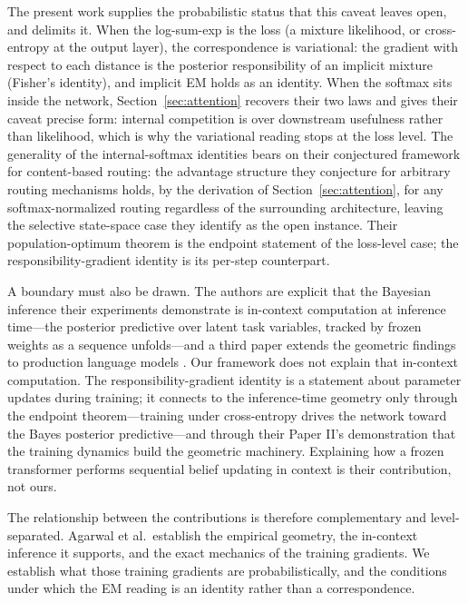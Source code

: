 The present work supplies the probabilistic status that this caveat leaves open, and delimits it. When the log-sum-exp is the loss (a mixture likelihood, or cross-entropy at the output layer), the correspondence is variational: the gradient with respect to each distance is the posterior responsibility of an implicit mixture (Fisher's identity), and implicit EM holds as an identity. When the softmax sits inside the network, Section~\ref{sec:attention} recovers their two laws and gives their caveat precise form: internal competition is over downstream usefulness rather than likelihood, which is why the variational reading stops at the loss level. The generality of the internal-softmax identities bears on their conjectured framework for content-based routing: the advantage structure they conjecture for arbitrary routing mechanisms holds, by the derivation of Section~\ref{sec:attention}, for any softmax-normalized routing regardless of the surrounding architecture, leaving the selective state-space case they identify as the open instance. Their population-optimum theorem is the endpoint statement of the loss-level case; the responsibility-gradient identity is its per-step counterpart.

A boundary must also be drawn. The authors are explicit that the Bayesian inference their experiments demonstrate is in-context computation at inference time---the posterior predictive over latent task variables, tracked by frozen weights as a sequence unfolds---and a third paper extends the geometric findings to production language models \citep{agarwal2025scaling}. Our framework does not explain that in-context computation. The responsibility-gradient identity is a statement about parameter updates during training; it connects to the inference-time geometry only through the endpoint theorem---training under cross-entropy drives the network toward the Bayes posterior predictive---and through their Paper II's demonstration that the training dynamics build the geometric machinery. Explaining how a frozen transformer performs sequential belief updating in context is their contribution, not ours.

The relationship between the contributions is therefore complementary and level-separated. Agarwal et al.\ establish the empirical geometry, the in-context inference it supports, and the exact mechanics of the training gradients. We establish what those training gradients are probabilistically, and the conditions under which the EM reading is an identity rather than a correspondence.


